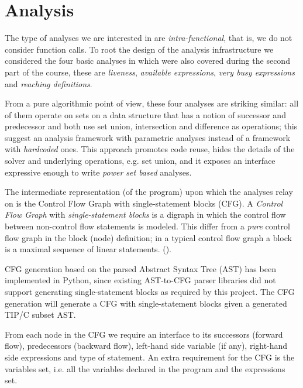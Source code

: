 \section{Analysis}

The type of analyses we are interested in are \emph{intra-functional}, that is, we do not consider function calls. To root the design of the analysis infrastructure
we considered the four basic analyses in \cite{spa} which were also covered during the second part of the course, these are \emph{liveness}, \emph{available expressions},
\emph{very busy expressions} and \emph{reaching definitions}. 

\newpar From a pure algorithmic point of view, these four analyses are striking similar: all of them operate on sets on a data structure that has a notion of successor and predecessor 
and both use set union, intersection and difference as operations; this suggest an analysis framework with parametric analyses instead of a framework with \emph{hardcoded}
ones. This approach promotes code reuse, hides the details of the solver and underlying operations, e.g. set union, and it exposes an interface expressive enough to
write \emph{power set based} analyses.


\newpar The intermediate representation (of the program) upon which the analyses relay on is the Control Flow Graph with single-statement blocks (CFG). A \emph{Control Flow Graph} with \emph{single-statement blocks} is a digraph in which the control flow between non-control flow statements is modeled. This differ from a \emph{pure} control flow graph in the block (node) definition; in a typical control flow graph a block is a maximal sequence of linear statements. (\cite{cooper}).

\newpar CFG generation based on the parsed Abstract Syntax Tree (AST) has been implemented in Python, since existing AST-to-CFG parser libraries did not support generating single-statement blocks as required by this project. The CFG generation will generate a CFG with single-statement blocks given a generated TIP/C subset AST. 

\newpar From each node in the CFG we require an interface to its successors (forward flow), predecessors (backward flow), left-hand side variable (if any), right-hand side expressions and type of statement.
An extra requirement for the CFG is the variables set, i.e. all the variables declared in the program and the expressions set.

